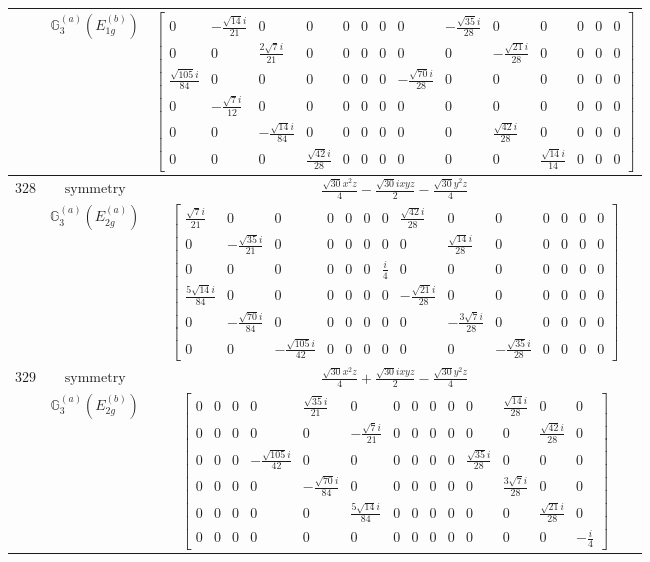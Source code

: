 \documentclass[fleqn,8pt,landscape]{jsarticle}
\begin{document}
\begin{longtable}{ccc}
$  $ & $ \mathbb{G}_{3}^{(a)}(E_{1g}^{(b)}) $ & $ \begin{bmatrix} 0 & - \frac{\sqrt{14} i}{21} & 0 & 0 & 0 & 0 & 0 & 0 & - \frac{\sqrt{35} i}{28} & 0 & 0 & 0 & 0 & 0 \\ 0 & 0 & \frac{2 \sqrt{7} i}{21} & 0 & 0 & 0 & 0 & 0 & 0 & - \frac{\sqrt{21} i}{28} & 0 & 0 & 0 & 0 \\ \frac{\sqrt{105} i}{84} & 0 & 0 & 0 & 0 & 0 & 0 & - \frac{\sqrt{70} i}{28} & 0 & 0 & 0 & 0 & 0 & 0 \\ 0 & - \frac{\sqrt{7} i}{12} & 0 & 0 & 0 & 0 & 0 & 0 & 0 & 0 & 0 & 0 & 0 & 0 \\ 0 & 0 & - \frac{\sqrt{14} i}{84} & 0 & 0 & 0 & 0 & 0 & 0 & \frac{\sqrt{42} i}{28} & 0 & 0 & 0 & 0 \\ 0 & 0 & 0 & \frac{\sqrt{42} i}{28} & 0 & 0 & 0 & 0 & 0 & 0 & \frac{\sqrt{14} i}{14} & 0 & 0 & 0 \end{bmatrix} $ \\ \hline
$ 328 $ & $ \text{symmetry} $ & $ \frac{\sqrt{30} x^{2} z}{4} - \frac{\sqrt{30} i x y z}{2} - \frac{\sqrt{30} y^{2} z}{4} $ \\
$  $ & $ \mathbb{G}_{3}^{(a)}(E_{2g}^{(a)}) $ & $ \begin{bmatrix} \frac{\sqrt{7} i}{21} & 0 & 0 & 0 & 0 & 0 & 0 & \frac{\sqrt{42} i}{28} & 0 & 0 & 0 & 0 & 0 & 0 \\ 0 & - \frac{\sqrt{35} i}{21} & 0 & 0 & 0 & 0 & 0 & 0 & \frac{\sqrt{14} i}{28} & 0 & 0 & 0 & 0 & 0 \\ 0 & 0 & 0 & 0 & 0 & 0 & \frac{i}{4} & 0 & 0 & 0 & 0 & 0 & 0 & 0 \\ \frac{5 \sqrt{14} i}{84} & 0 & 0 & 0 & 0 & 0 & 0 & - \frac{\sqrt{21} i}{28} & 0 & 0 & 0 & 0 & 0 & 0 \\ 0 & - \frac{\sqrt{70} i}{84} & 0 & 0 & 0 & 0 & 0 & 0 & - \frac{3 \sqrt{7} i}{28} & 0 & 0 & 0 & 0 & 0 \\ 0 & 0 & - \frac{\sqrt{105} i}{42} & 0 & 0 & 0 & 0 & 0 & 0 & - \frac{\sqrt{35} i}{28} & 0 & 0 & 0 & 0 \end{bmatrix} $ \\ \hline
$ 329 $ & $ \text{symmetry} $ & $ \frac{\sqrt{30} x^{2} z}{4} + \frac{\sqrt{30} i x y z}{2} - \frac{\sqrt{30} y^{2} z}{4} $ \\
$  $ & $ \mathbb{G}_{3}^{(a)}(E_{2g}^{(b)}) $ & $ \begin{bmatrix} 0 & 0 & 0 & 0 & \frac{\sqrt{35} i}{21} & 0 & 0 & 0 & 0 & 0 & 0 & \frac{\sqrt{14} i}{28} & 0 & 0 \\ 0 & 0 & 0 & 0 & 0 & - \frac{\sqrt{7} i}{21} & 0 & 0 & 0 & 0 & 0 & 0 & \frac{\sqrt{42} i}{28} & 0 \\ 0 & 0 & 0 & - \frac{\sqrt{105} i}{42} & 0 & 0 & 0 & 0 & 0 & 0 & \frac{\sqrt{35} i}{28} & 0 & 0 & 0 \\ 0 & 0 & 0 & 0 & - \frac{\sqrt{70} i}{84} & 0 & 0 & 0 & 0 & 0 & 0 & \frac{3 \sqrt{7} i}{28} & 0 & 0 \\ 0 & 0 & 0 & 0 & 0 & \frac{5 \sqrt{14} i}{84} & 0 & 0 & 0 & 0 & 0 & 0 & \frac{\sqrt{21} i}{28} & 0 \\ 0 & 0 & 0 & 0 & 0 & 0 & 0 & 0 & 0 & 0 & 0 & 0 & 0 & - \frac{i}{4} \end{bmatrix} $ \\ \hline

\end{longtable}
\end{document}
